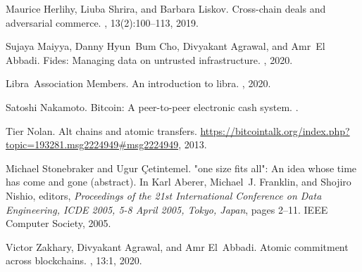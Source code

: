 \documentclass[11pt]{article}
\begin{document}
\begin{thebibliography}{10}
Maurice Herlihy, Liuba Shrira, and Barbara Liskov.
\newblock Cross-chain deals and adversarial commerce.
, 13(2):100--113, 2019.

Sujaya Maiyya, Danny Hyun~Bum Cho, Divyakant Agrawal, and Amr~El Abbadi.
\newblock Fides: Managing data on untrusted infrastructure.
, 2020.

Libra~Association Members.
\newblock An introduction to libra.
, 2020.

Satoshi Nakamoto.
\newblock Bitcoin: A peer-to-peer electronic cash system.
.

Tier Nolan.
\newblock Alt chains and atomic transfers.
\newblock
  \url{https://bitcointalk.org/index.php?topic=193281.msg2224949#msg2224949},
  2013.

Michael Stonebraker and Ugur {\c{C}}etintemel.
\newblock "one size fits all": An idea whose time has come and gone (abstract).
\newblock In Karl Aberer, Michael~J. Franklin, and Shojiro Nishio, editors,
  {\em Proceedings of the 21st International Conference on Data Engineering,
  {ICDE} 2005, 5-8 April 2005, Tokyo, Japan}, pages 2--11. {IEEE} Computer
  Society, 2005.

Victor Zakhary, Divyakant Agrawal, and Amr El~Abbadi.
\newblock Atomic commitment across blockchains.
, 13:1, 2020.

\end{thebibliography}
\end{document}
